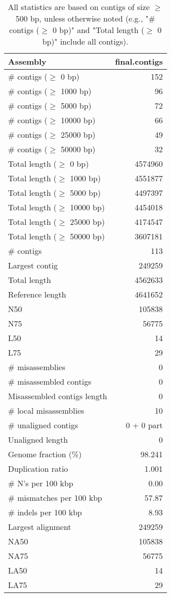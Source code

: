 \documentclass[12pt,a4paper]{article}
\begin{document}
\begin{table}[ht]
\begin{center}
\caption{All statistics are based on contigs of size $\geq$ 500 bp, unless otherwise noted (e.g., "\# contigs ($\geq$ 0 bp)" and "Total length ($\geq$ 0 bp)" include all contigs).}
\begin{tabular}{|l*{1}{|r}|}
\hline
Assembly & final.contigs \\ \hline
\# contigs ($\geq$ 0 bp) & 152 \\ \hline
\# contigs ($\geq$ 1000 bp) & 96 \\ \hline
\# contigs ($\geq$ 5000 bp) & 72 \\ \hline
\# contigs ($\geq$ 10000 bp) & 66 \\ \hline
\# contigs ($\geq$ 25000 bp) & 49 \\ \hline
\# contigs ($\geq$ 50000 bp) & 32 \\ \hline
Total length ($\geq$ 0 bp) & 4574960 \\ \hline
Total length ($\geq$ 1000 bp) & 4551877 \\ \hline
Total length ($\geq$ 5000 bp) & 4497397 \\ \hline
Total length ($\geq$ 10000 bp) & 4454018 \\ \hline
Total length ($\geq$ 25000 bp) & 4174547 \\ \hline
Total length ($\geq$ 50000 bp) & 3607181 \\ \hline
\# contigs & 113 \\ \hline
Largest contig & 249259 \\ \hline
Total length & 4562633 \\ \hline
Reference length & 4641652 \\ \hline
N50 & 105838 \\ \hline
N75 & 56775 \\ \hline
L50 & 14 \\ \hline
L75 & 29 \\ \hline
\# misassemblies & 0 \\ \hline
\# misassembled contigs & 0 \\ \hline
Misassembled contigs length & 0 \\ \hline
\# local misassemblies & 10 \\ \hline
\# unaligned contigs & 0 + 0 part \\ \hline
Unaligned length & 0 \\ \hline
Genome fraction (\%) & 98.241 \\ \hline
Duplication ratio & 1.001 \\ \hline
\# N's per 100 kbp & 0.00 \\ \hline
\# mismatches per 100 kbp & 57.87 \\ \hline
\# indels per 100 kbp & 8.93 \\ \hline
Largest alignment & 249259 \\ \hline
NA50 & 105838 \\ \hline
NA75 & 56775 \\ \hline
LA50 & 14 \\ \hline
LA75 & 29 \\ \hline
\end{tabular}
\end{center}
\end{table}
\end{document}
